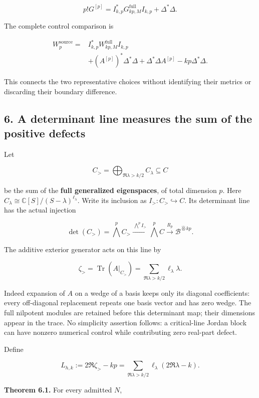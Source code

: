 \[
\boxed{
p!G^{[p]}=I_{k,p}^*G_{kp,M}^{\mathrm{full}}I_{k,p}+\Delta^*\Delta.
}
\]

The complete control comparison is

\[
\begin{aligned}
W_p^{\mathrm{source}}={}&I_{k,p}^*W_{kp,M}^{\mathrm{full}}I_{k,p}\\
&+(A^{[p]})^*\Delta^*\Delta+\Delta^*\Delta A^{[p]}-kp\Delta^*\Delta.
\end{aligned}
\]

This connects the two representative choices without identifying their
metrics or discarding their boundary difference.

\subsection{6. A determinant line measures the sum of the positive
defects}\label{exterior_trace:a-determinant-line-measures-the-sum-of-the-positive-defects}

Let

\[
C_{>}=\bigoplus_{\Re\lambda>k/2}C_\lambda\subseteq C
\]

be the sum of the \textbf{full generalized eigenspaces}, of total
dimension \(p\). Here
\(C_\lambda\cong\mathbb C[S]/(S-\lambda)^{\ell_\lambda}\). Write its
inclusion as \(I_{>}:C_{>}\hookrightarrow C\). Its determinant line has
the actual injection

\[
\det(C_{>})=\bigwedge^p C_{>}
\xrightarrow{\,\bigwedge^p I_{>}\,}
\bigwedge^p C
\xrightarrow{R_p}
\mathscr B^{\widehat\otimes kp}.
\]

The additive exterior generator acts on this line by

\[
\zeta_{>}=\operatorname{Tr}(A|_{C_{>}})
=\sum_{\Re\lambda>k/2}\ell_\lambda\lambda.
\]

Indeed expansion of \(A\) on a wedge of a basis keeps only its diagonal
coefficients: every off-diagonal replacement repeats one basis vector
and has zero wedge. The full nilpotent modules are retained before this
determinant map; their dimensions appear in the trace. No simplicity
assertion follows: a critical-line Jordan block can have nonzero
numerical control while contributing zero real-part defect.

Define

\[
\boxed{
L_{h,k}:=2\Re\zeta_{>}-kp
=\sum_{\Re\lambda>k/2}\ell_\lambda(2\Re\lambda-k).
}
\]

\textbf{Theorem 6.1.} For every admitted \(N\),

